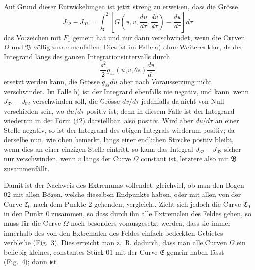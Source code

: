 \documentclass[11pt,a4paper,leqno]{article}
\begin{document}
Auf Grund dieser Entwickelungen ist jetzt streng zu erweisen, dass die Grösse
\[
J_{32}-\overline{J}_{02}
=\int_3^2\left[G\left(u,v,\frac{du}{d\tau},\frac{dv}{d\tau}\right)-\frac{du}{d\tau}\right]d\tau
\]
das Vorzeichen mit $F_1$ gemein hat und nur dann verschwindet, wenn die Curven $\Omega$ und $\mathfrak{B}$ völlig zusammenfallen. Dies ist im Falle a) ohne Weiteres klar, da der Integrand längs des ganzen Integrationsintervalls durch
\begin{equation}\tag{42}
\frac{s^2}{2}g_{ss}(u,v,\theta s)\frac{du}{d\tau}
\end{equation}
ersetzt werden kann, die Grösse $g_{ss}du$ aber nach Voraussetzung nicht verschwindet. Im Falle b) ist der Integrand ebenfalls nie negativ, und kann, wenn $J_{32}-\overline{J}_{02}$ verschwinden soll, die Grösse $dv/d\tau$ jedenfalls da nicht von Null verschieden sein, wo $du/d\tau$ positiv ist; denn in diesem Falle ist der Integrand wiederum in der Form (42) darstellbar, also positiv. Wird aber $du/d\tau$ an einer Stelle negativ, so ist der Integrand des obigen Integrals wiederum positiv; da derselbe nun, wie oben bemerkt, längs einer endlichen Strecke positiv bleibt, wenn dies an einer einzigen Stelle eintritt, so kann das Integral $J_{32}-\overline{J}_{02}$ sicher nur verschwinden, wenn $v$ längs der Curve $\Omega$ constant ist, letztere also mit $\mathfrak{B}$ zusammenfällt.

Damit ist der Nachweis des Extremums vollendet, gleichviel, ob man den Bogen 02 mit allen Bögen, welche dieselben Endpunkte haben, oder mit allen von der Curve $\mathfrak{C}_0$ nach dem Punkte 2 gehenden, vergleicht. Zieht sich jedoch die Curve $\mathfrak{C}_0$ in
den Punkt 0 zusammen, so dass durch ihn alle Extremalen des Feldes gehen, so muss für die Curve $\Omega$ noch besonders vorausgesetzt werden, dass sie immer innerhalb des von den Extremalen des Feldes einfach bedeckten Gebietes verbleibe (Fig.~3). Dies erreicht man z.~B. dadurch, dass man alle Curven $\Omega$ ein beliebig kleines, constantes Stück 01 mit der Curve $\mathfrak{E}$ gemein haben lässt (Fig.~4); dann ist
\end{document}
